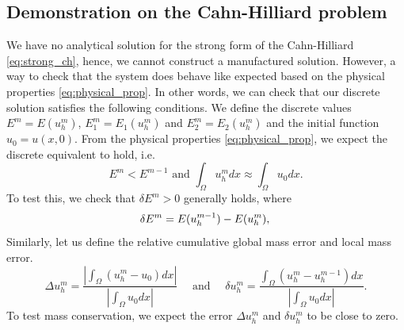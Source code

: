 \documentclass[11pt]{article}
\theoremstyle{remark}
\newcommand{\abs}[1]{\left\lvert #1 \right\rvert}
\numberwithin{equation}{section}
\begin{document}
\subsection{Demonstration on the Cahn-Hilliard problem}%
\label{sub:demonstration_on_the_physical_cahn_hilliard}

We have no analytical solution for the strong form of the Cahn-Hilliard \eqref{eq:strong_ch}, hence, we cannot construct a manufactured solution. However, a way to check that the system does behave like expected based on the physical properties \eqref{eq:physical_prop}. In other
words, we can check that our discrete solution satisfies the following conditions. We define the discrete values $E^m = E( u_{h}^{m})$, $E_{1}^m = E_{1}( u_{h}^{m})$ and $E_{2}^m = E_{2}( u_{h}^{m})$ and the initial function  $u_{0} = u( x,0) $. From
the physical properties \eqref{eq:physical_prop}, we expect the discrete equivalent to hold, i.e.
\begin{equation}
    E^m   <  E^{ m-1 } \text{ and }   \int_{\Omega }^{} u_{h}^{m}   dx \approx \int_{\Omega }^{} u_{0}  dx.
\end{equation}
To test this, we check that $ \delta E^{m} >0 $ generally holds, where
\begin{equation}
 \delta E^{m} = E( u_{h}^{m-1}) -  E( u_{h}^{m}) ,  \\
\end{equation}
 Similarly, let us define the relative cumulative global mass error and local mass error.
 \begin{equation}
 \Delta u_{h}^{m}  = \frac{ \abs{ \int_{\Omega }^{}  ( u_h^{m} - u_{0} ) dx } }{ \abs{ \int_{\Omega }^{}  u_{0} dx } } \quad \text{ and } \quad
 \delta u_{h}^{m}  = \frac{  \int_{\Omega }^{}  ( u_h^{m} - u^{m-1}_{h} ) dx  }{ \abs{ \int_{\Omega }^{}  u_{0} dx } }.
 \end{equation}
 To test mass conservation, we expect the error $\Delta u_{h}^{m}$ and $\delta u_{h}^{m}$   to be close to zero.
\end{document}
